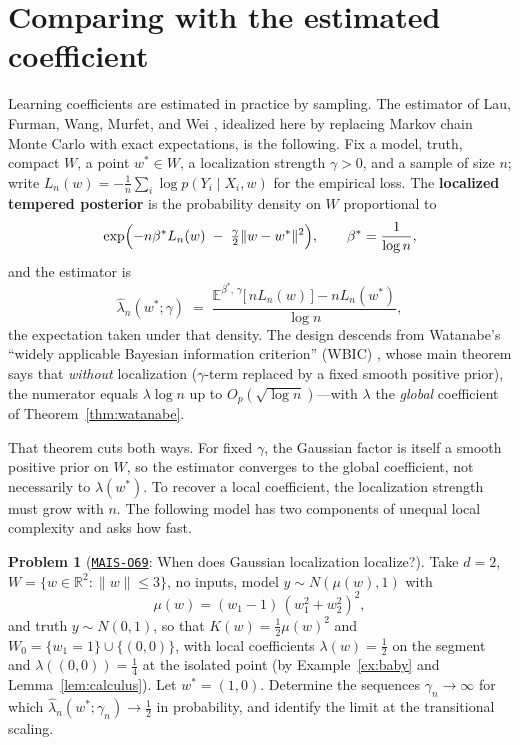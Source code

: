 \documentclass[11pt]{amsart}
\newcommand{\Oid}[1]{\href{https://github.com/lionellevine/MAIS/blob/main/open-problems/MAIS-O#1.md}{\texttt{MAIS-O#1}}}
\theoremstyle{plain}
\theoremstyle{definition}
\newtheorem{problem}[theorem]{Problem}
\newcommand{\R}{\mathbb{R}}
\newcommand{\E}{\mathbb{E}}
\begin{document}
\section{Comparing with the estimated coefficient}\label{sec:estimator}

Learning coefficients are estimated in practice by sampling. The estimator of Lau, Furman, Wang, Murfet, and Wei \cite{lau2023}, idealized here by replacing Markov chain Monte Carlo with exact expectations, is the following. Fix a model, truth, compact $W$, a point $w^* \in W$, a localization strength $\gamma > 0$, and a sample of size $n$; write $L_n(w) = -\frac1n \sum_i \log p(Y_i \mid X_i, w)$ for the empirical loss. The \textbf{localized tempered posterior} is the probability density on $W$ proportional to
\[
   \exp\Bigl( -n\beta^* L_n(w) \;-\; \tfrac{\gamma}{2}\|w - w^*\|^2 \Bigr),
   \qquad \beta^* = \frac{1}{\log n},
\]
and the estimator is
\[
   \hat\lambda_n(w^*; \gamma) \;=\; \frac{\E^{\beta^*\!,\,\gamma}\bigl[\, n L_n(w) \,\bigr] - n L_n(w^*)}{\log n},
\]
the expectation taken under that density. The design descends from Watanabe's ``widely applicable Bayesian information criterion'' (WBIC) \cite{watanabe2013}, whose main theorem says that \emph{without} localization ($\gamma$-term replaced by a fixed smooth positive prior), the numerator equals $\lambda \log n$ up to $O_p(\sqrt{\log n})$---with $\lambda$ the \emph{global} coefficient of Theorem~\ref{thm:watanabe}.

That theorem cuts both ways. For fixed $\gamma$, the Gaussian factor is itself a smooth positive prior on $W$, so the estimator converges to the global coefficient, not necessarily to $\lambda(w^*)$. To recover a local coefficient, the localization strength must grow with $n$. The following model has two components of unequal local complexity and asks how fast.

\begin{problem}[\Oid{69}: When does Gaussian localization localize?]\label{prob:estimator}
Take $d = 2$, $W = \{w \in \R^2 : \|w\| \le 3\}$, no inputs, model $y \sim N(\mu(w), 1)$ with
\[
   \mu(w) = (w_1 - 1)\,(w_1^2 + w_2^2)^2,
\]
and truth $y \sim N(0,1)$, so that $K(w) = \tfrac12 \mu(w)^2$ and $W_0 = \{w_1 = 1\} \cup \{(0,0)\}$, with local coefficients $\lambda(w) = \tfrac12$ on the segment and $\lambda((0,0)) = \tfrac14$ at the isolated point \textup{(}by Example~\textup{\ref{ex:baby}} and Lemma~\textup{\ref{lem:calculus}}\textup{)}. Let $w^* = (1, 0)$.
Determine the sequences $\gamma_n \to \infty$ for which $\hat\lambda_n(w^*;\gamma_n)\to\tfrac12$ in probability, and identify the limit at the transitional scaling.
\end{problem}
\end{document}
